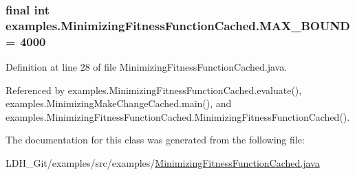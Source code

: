 \hypertarget{classexamples_1_1_minimizing_fitness_function_cached_a5ad11b92f0fb2a01accd4c532a40f192}{
\subsubsection[{M\-A\-X\-\_\-\-B\-O\-U\-N\-D}]{\setlength{\rightskip}{0pt plus 5cm}final int examples.\-Minimizing\-Fitness\-Function\-Cached.\-M\-A\-X\-\_\-\-B\-O\-U\-N\-D = 4000\hspace{0.3cm}{\ttfamily [static]}}}\label{classexamples_1_1_minimizing_fitness_function_cached_a5ad11b92f0fb2a01accd4c532a40f192}


Definition at line 28 of file Minimizing\-Fitness\-Function\-Cached.\-java.



Referenced by examples.\-Minimizing\-Fitness\-Function\-Cached.\-evaluate(), examples.\-Minimizing\-Make\-Change\-Cached.\-main(), and examples.\-Minimizing\-Fitness\-Function\-Cached.\-Minimizing\-Fitness\-Function\-Cached().



The documentation for this class was generated from the following file\-:\begin{DoxyCompactItemize}
\item 
L\-D\-H\-\_\-\-Git/examples/src/examples/\hyperlink{_minimizing_fitness_function_cached_8java}{Minimizing\-Fitness\-Function\-Cached.\-java}\end{DoxyCompactItemize}
